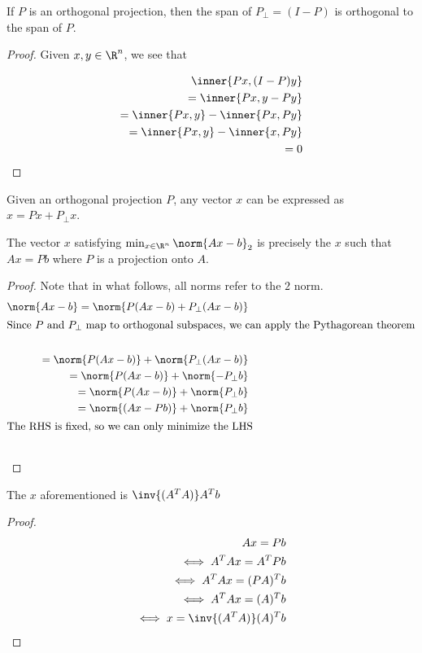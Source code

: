 \documentclass[../main.tex]{subfiles}
\begin{document}
\begin{proposition}
    If $P$ is an orthogonal projection, then the span of $P_{\perp} = (I - P)$ is orthogonal to the span of $P$.
\end{proposition}
\begin{proof}
    Given $x,y \in \R^n$, we see that

    \begin{align*}
        \inner{Px, (I - P)y} \\
        = \inner{Px, y - Py} \\
        = \inner{Px, y} - \inner{Px, Py} \\
        = \inner{Px, y} - \inner{x, Py} \\
        = 0
    \end{align*}
\end{proof}

\begin{corollary}
    Given an orthogonal projection $P$, any vector $x$ can be expressed as $x = Px + P_{\perp}x$.
\end{corollary}

\begin{proposition}
    The vector $x$ satisfying $\min_{x \in \R^n} \norm{Ax - b}_2$ is precisely the $x$ such that $Ax = Pb$ where $P$ is a projection onto $A$.
\end{proposition}

\begin{proof}
    Note that in what follows, all norms refer to the $2$ norm.
    \begin{align*}
        \norm{Ax - b} = \norm{P(Ax -b) + P_{\perp}(Ax - b)} \\
        \intertext{Since $P$ and $P_{\perp}$ map to orthogonal subspaces, we can apply the Pythagorean theorem} \\
        = \norm{P(Ax -b)} + \norm{P_{\perp}(Ax - b)} \\
        = \norm{P(Ax -b)} + \norm{-P_{\perp}b} \\
        = \norm{P(Ax -b)} + \norm{P_{\perp}b} \\
        = \norm{(Ax - Pb)} + \norm{P_{\perp}b} \\
        \intertext{The RHS is fixed, so we can only minimize the LHS} \\
    \end{align*}
\end{proof}

\begin{corollary}
    The $x$ aforementioned is $\inv{(A^TA)}A^Tb$ 
\end{corollary}
\begin{proof}
    \begin{align*}
        Ax = Pb \\
        \iff A^TAx = A^TPb \\
        \iff A^TAx = (PA)^Tb \\
        \iff A^TAx = (A)^Tb \\
        \iff x = \inv{(A^TA)}(A)^Tb \\
    \end{align*}
\end{proof}
\end{document}

